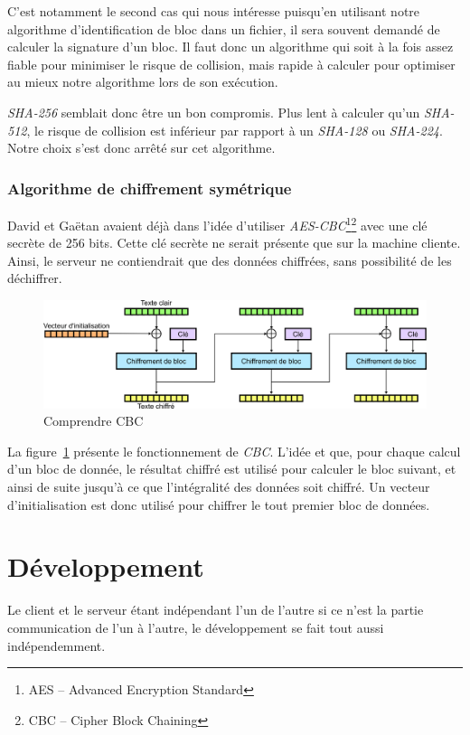 \documentclass[a4paper,10pt, twoside]{report}
\begin{document}
\begin{spacing}{1.2}
C'est notamment le second cas qui nous intéresse puisqu'en utilisant notre
algorithme d'identification de bloc dans un fichier, il sera souvent demandé
de calculer la signature d'un bloc. Il faut donc un algorithme qui soit à la
fois assez fiable pour minimiser le risque de collision, mais rapide à
calculer pour optimiser au mieux notre algorithme lors de son exécution.

\textit{SHA-256}\cite{refSHA256} semblait donc être un bon compromis. Plus
lent à calculer qu'un \textit{SHA-512}, le risque de collision est
inférieur par rapport à un \textit{SHA-128} ou \textit{SHA-224}. Notre
choix s'est donc arrêté sur cet algorithme.

\subsubsection{Algorithme de chiffrement symétrique}
David et Gaëtan avaient déjà dans l'idée d'utiliser
\textit{AES-CBC}\footnote{AES -- Advanced Encryption Standard}\footnote{CBC --
Cipher Block Chaining}\cite{refAES}\cite{refCBC} avec une clé secrète de
256 bits. Cette clé secrète ne serait présente que sur la machine cliente.
Ainsi, le serveur ne contiendrait que des données chiffrées, sans
possibilité de les déchiffrer.

\begin{figure}[h!]
  \centering
  \includegraphics[width=15cm]{softwareDesign/schemaCBC.png}
  \caption{\label{schemaCBC} Comprendre CBC}
\end{figure}

La figure~\ref{schemaCBC} présente le fonctionnement de \textit{CBC}. L'idée
et que, pour chaque calcul d'un bloc de donnée, le résultat chiffré est
utilisé pour calculer le bloc suivant, et ainsi de suite jusqu'à ce que
l'intégralité des données soit chiffré. Un vecteur d'initialisation
est donc utilisé pour chiffrer le tout premier bloc de données.


\section{Développement}
Le client et le serveur étant indépendant l'un de l'autre si ce n'est la
partie communication de l'un à l'autre, le développement se fait tout
aussi indépendemment.


\end{spacing}
\end{document}
